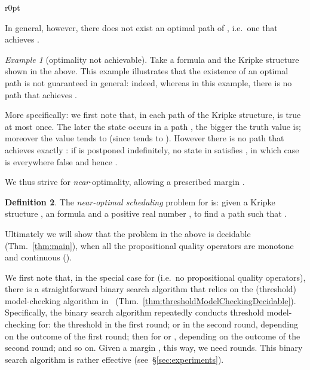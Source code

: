 \documentclass[a4paper,USenglish,numberwithinsect]{lipics}
\theoremstyle{definition}
\newtheorem{defi}{Definition}[section]
\theoremstyle{remark}
\newtheorem{exam}[defi]{Example}
\theoremstyle{plain}
\begin{document}
\begin{wrapfigure}[2]{r}{0pt}
\end{wrapfigure}
 In general, however, there does not exist an optimal path 
 of , i.e.\ one that achieves . 

\begin{exam}[optimality not achievable]\label{exam:optimalityNotAchievable}
Take a formula 
 and the Kripke structure  shown in the above.  
This example illustrates that the existence of an optimal path is 
not guaranteed in general: indeed, whereas  in this example, there is no path   that achieves .

 More specifically: we first
 note that, in each 
 path  of the Kripke structure,   is true
 at most once. The later the state  occurs in a path , the bigger the
 truth value  is;  moreover the value  tends to  (since  tends to ). 
 However there is no path  that achieves exactly : if  is postponed indefinitely, no state in
  satisfies , in which case  is 
 everywhere false and hence .
\end{exam}



We thus strive for \emph{near}-optimality, allowing
a prescribed margin .





\begin{defi}\label{def:nearOptimalPathSynthesis}
 The \emph{near-optimal scheduling} problem for  is:
given a Kripke structure , an  formula  and a positive real number , to
find a path  such that . 
\end{defi}
Ultimately we will show that the problem in the above is decidable (Thm.~\ref{thm:main}), when all
the propositional quality operators are monotone and continuous
(). 


We first note that, in the special case for 
 (i.e.\ no propositional quality operators), there is a straightforward binary search algorithm
that 
relies on the (threshold) model-checking algorithm
in~\cite{AlmagorBK14} (Thm.~\ref{thm:thresholdModelCheckingDecidable}). Specifically, the binary search algorithm
repeatedly conducts threshold model-checking for:
 the threshold  in the first round;   or
  in the second round,
       depending on the outcome of the first round;  then
       for  or , depending on the outcome of the second round; and so on.  
Given a margin
       ,  this way, we need   rounds. 
This binary search algorithm is rather effective (see~\S{}\ref{sec:experiments}).
\end{document}
